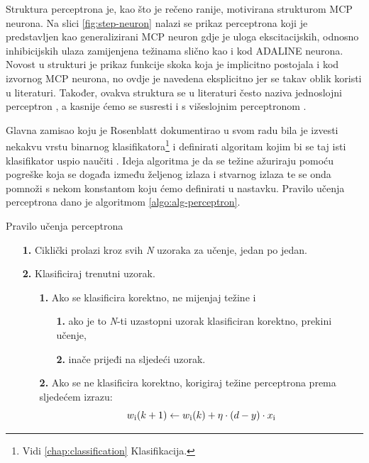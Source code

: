 \documentclass[times, utf8, zavrsni]{fer}
\begin{document}
Struktura perceptrona je, kao što je rečeno ranije, motivirana strukturom MCP neurona. Na slici \ref{fig:step-neuron} nalazi se prikaz perceptrona koji je predstavljen kao generalizirani MCP neuron gdje je uloga ekscitacijskih, odnosno inhibicijskih ulaza zamijenjena težinama slično kao i kod ADALINE neurona. Novost u strukturi je prikaz funkcije skoka  koja je implicitno postojala i kod izvornog MCP neurona, no ovdje je navedena eksplicitno jer se takav oblik koristi u literaturi. Također, ovakva struktura se u literaturi često naziva jednoslojni perceptron , a kasnije ćemo se susresti i s višeslojnim perceptronom .

Glavna zamisao koju je Rosenblatt dokumentirao u svom radu bila je izvesti nekakvu vrstu binarnog klasifikatora\footnote{Vidi \ref{chap:classification} Klasifikacija.} i definirati algoritam kojim bi se taj isti klasifikator uspio naučiti \citep{rosenblatt}. Ideja algoritma je da se težine ažuriraju pomoću pogreške koja se događa između željenog izlaza i stvarnog izlaza te se onda pomnoži s nekom konstantom koju ćemo definirati u nastavku. Pravilo učenja perceptrona dano je algoritmom \ref{algo:alg-perceptron}.

\begin{algorithm}
\caption{Pravilo učenja perceptrona\footnotemark}
\label{algo:alg-perceptron}
    \begin{enumerate}
        \item[\textbf{1.}] Ciklički prolazi kroz svih \textit{N} uzoraka za učenje, jedan po jedan.
        \item[\textbf{2.}] Klasificiraj trenutni uzorak.
        \begin{enumerate}
            \item[\textbf{1.}] Ako se klasificira korektno, ne mijenjaj težine i
            \begin{enumerate}
                \item[\textbf{1.}] ako je to \textit{N}-ti uzastopni uzorak klasificiran korektno, prekini učenje,
                \item[\textbf{2.}] inače prijeđi na sljedeći uzorak.
            \end{enumerate}
            \item[\textbf{2.}] Ako se ne klasificira korektno, korigiraj težine perceptrona prema sljedećem izrazu: 
            \begin{equation}
            \label{percep:eq}
                w\textsubscript{i}(k+1) \leftarrow w\textsubscript{i}(k) + \eta \cdot (d-y) \cdot x\textsubscript{i}
            \end{equation}
        \end{enumerate}
    \end{enumerate}
\end{algorithm}
\end{document}
